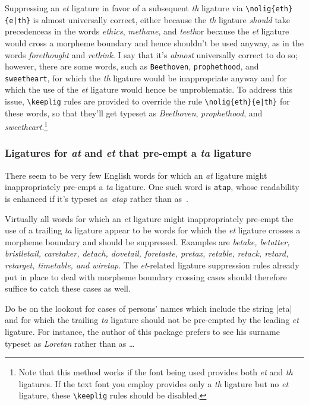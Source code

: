 \documentclass[11pt]{article}
\newcommand{\opt}[1]{\texttt{#1}}
\newcommand{\cmmd}[1]{\texttt{\textbackslash #1}}
\begin{document}
Suppressing an \emph{et} ligature in favor of a subsequent \emph{th} ligature via \Verb+\nolig{eth}{e|th}+ is almost universally correct, either because the \emph{th} ligature \emph{should} take precedence\textemdash as in the words \emph{ethics}, \emph{methane}, and \emph{teeth}\textemdash or because the \emph{et} ligature would cross a morpheme boundary and hence shouldn't be used anyway, as in the words \emph{forethought} and \emph{rethink}. 
I say that it's \emph{almost} universally correct to do so; however, there are some words, such as \opt{Beethoven}, \opt{prophethood}, and \opt{sweetheart}, for which the \emph{th} ligature would be inappropriate anyway and for which the use of the \emph{et} ligature would hence be unproblematic. To address this issue, \cmmd{keeplig} rules are provided to override the rule \Verb+\nolig{eth}{e|th}+ for these words, so that they'll get typeset as \emph{Beethoven}, \emph{prophethood}, and \emph{sweetheart}.\footnote{Note that this method works if the font being used provides both \emph{et} and \emph{th} ligatures. If the text font you employ provides only a \emph{th} ligature but no \emph{et} ligature, these \cmmd{keeplig} rules should be disabled.}


\subsubsection*{Ligatures for \emph{at} and \emph{et} that pre-empt a \emph{ta} ligature}

There seem to be very few English words for which an \emph{at} ligature might inappropriately pre-empt a \emph{ta} ligature. One such word is \opt{atap}, whose readability is enhanced if it's typeset as~\emph{atap} rather than as~\emph{}.

Virtually all words for which an \emph{et} ligature might inappropriately pre-empt the use of a trailing \emph{ta} ligature appear to be words for which the \emph{et} ligature crosses a morpheme boundary and should be suppressed. Examples are \emph{betake, betatter, bristletail, caretaker, detach, dovetail, foretaste, pretax, retable, retack, retard, retarget, timetable, \emph{and} wiretap}. The \emph{et}-related ligature suppression rules already put in place to deal with morpheme boundary crossing cases should therefore suffice to catch these cases as well. 

Do be on the lookout for cases of persons' names which include the string |eta| and for which the trailing \emph{ta} ligature should not be pre-empted by the leading \emph{et} ligature. For instance, the author of this package prefers to see his surname typeset as \emph{Loretan} rather than as \emph{}\dots
\end{document}
